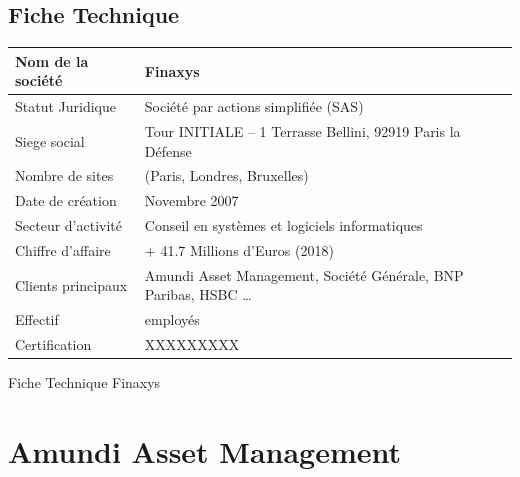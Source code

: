 \section{Fiche Technique}
\def\arraystretch{1.7}
\begin{center}
    \begin{tabularx}{0.9\textwidth} { 
        | >{\raggedright\arraybackslash}X
        | >{\centering\arraybackslash}X | }
    \hline
    Nom de la société   &   Finaxys \\
    \hline
    Statut Juridique    &   Société par actions simplifiée (SAS) \\
    \hline
    Siege social        &   Tour INITIALE – 1 Terrasse Bellini,  92919 Paris la Défense  \\
    \hline
    Nombre de sites     &   3 (Paris, Londres, Bruxelles) \\
    \hline
    Date de création    &   Novembre 2007  \\
    \hline
    Secteur d’activité  &   Conseil en systèmes et logiciels informatiques  \\
    \hline
    Chiffre d’affaire   &   + 41.7 Millions d'Euros (2018)  \\
    \hline
    Clients principaux  &   Amundi Asset Management, Société Générale, BNP Paribas, HSBC \dots  \\
    \hline
    Effectif            &   350 employés\\
    \hline
    Certification       &   XXXXXXXXX  \\
    \hline
    \end{tabularx}
    \begin{table}[htp]
        \caption{Fiche Technique Finaxys}
    \end{table}
\end{center}

\chapter{Amundi Asset Management}

